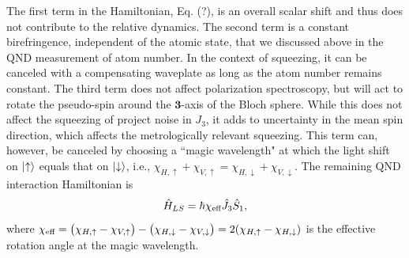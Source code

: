 \documentclass[preprint,aps,pra,onecolumn]{revtex4-1} %
\begin{document}
The first term in the Hamiltonian, Eq. (?), is an overall scalar shift and thus does not contribute to the relative dynamics.  The second term is a constant birefringence, independent of the atomic state, that we discussed above in the QND measurement of atom number.  In the context of squeezing, it can be canceled with a compensating waveplate as long as the atom number remains constant. The third term does not affect polarization spectroscopy, but will act to rotate the pseudo-spin around the $\mathbf{3}$-axis of the Bloch sphere.  While this does not affect the squeezing of project noise in $J_3$, it adds to uncertainty in the mean spin direction, which affects the metrologically relevant squeezing.   This term can, however, be canceled by choosing a ``magic wavelength" at which the light shift on $\lvert{\uparrow}\rangle$ equals that on $\lvert{\downarrow}\rangle$, i.e., 
$\chi_{H,\uparrow} +\chi_{V,\uparrow}  = \chi_{H,\downarrow} + \chi_{V,\downarrow}.$ The remaining QND interaction Hamiltonian is
\begin{equation}
\hat{H}_{LS} = \hbar \chi_{\text{eff}} \hat{J}_3 \hat{S}_1,
\end{equation}
where $\chi_{\text{eff}} = \big( \chi_{H, \uparrow} - \chi_{V,\uparrow} \big) - \big(\chi_{H,\downarrow} - \chi_{V,\downarrow} \big) = 2(\chi_{H, \uparrow}-\chi_{H, \downarrow})$ is the effective rotation angle at the magic wavelength.
\end{document}
